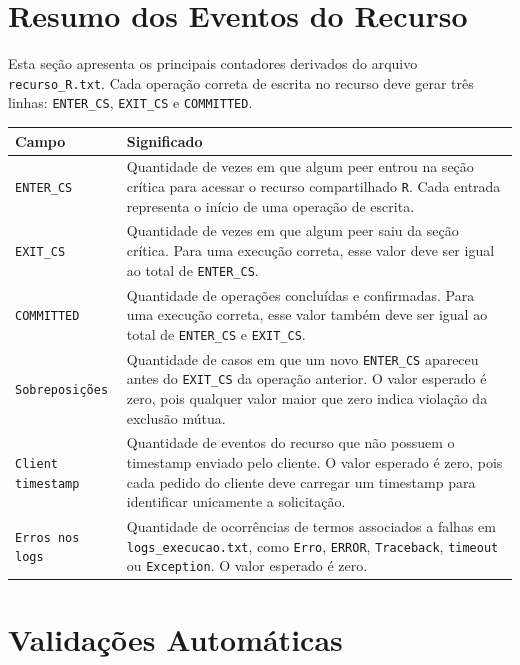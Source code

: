 \documentclass[12pt,a4paper]{article}
\begin{document}
\section{Resumo dos Eventos do Recurso}

Esta se\c{c}\~ao apresenta os principais contadores derivados do arquivo
\texttt{recurso\_R.txt}. Cada opera\c{c}\~ao correta de escrita no recurso deve gerar tr\^es
linhas: \texttt{ENTER\_CS}, \texttt{EXIT\_CS} e \texttt{COMMITTED}.

\begin{longtable}{>{\raggedright\arraybackslash}p{4cm} >{\raggedright\arraybackslash}p{10cm}}
\toprule
\textbf{Campo} & \textbf{Significado} \\
\midrule
\texttt{ENTER\_CS} &
Quantidade de vezes em que algum peer entrou na se\c{c}\~ao cr\'itica para acessar o recurso
compartilhado \texttt{R}. Cada entrada representa o in\'icio de uma opera\c{c}\~ao de escrita. \\
\texttt{EXIT\_CS} &
Quantidade de vezes em que algum peer saiu da se\c{c}\~ao cr\'itica. Para uma execu\c{c}\~ao
correta, esse valor deve ser igual ao total de \texttt{ENTER\_CS}. \\
\texttt{COMMITTED} &
Quantidade de opera\c{c}\~oes conclu\'idas e confirmadas. Para uma execu\c{c}\~ao correta,
esse valor tamb\'em deve ser igual ao total de \texttt{ENTER\_CS} e \texttt{EXIT\_CS}. \\
\texttt{Sobreposi\c{c}\~oes} &
Quantidade de casos em que um novo \texttt{ENTER\_CS} apareceu antes do \texttt{EXIT\_CS}
da opera\c{c}\~ao anterior. O valor esperado \'e zero, pois qualquer valor maior que zero
indica viola\c{c}\~ao da exclus\~ao m\'utua. \\
\texttt{Client timestamp} &
Quantidade de eventos do recurso que n\~ao possuem o timestamp enviado pelo cliente. O valor
esperado \'e zero, pois cada pedido do cliente deve carregar um timestamp para identificar
unicamente a solicita\c{c}\~ao. \\
\texttt{Erros nos logs} &
Quantidade de ocorr\^encias de termos associados a falhas em \texttt{logs\_execucao.txt},
como \texttt{Erro}, \texttt{ERROR}, \texttt{Traceback}, \texttt{timeout} ou
\texttt{Exception}. O valor esperado \'e zero. \\
\bottomrule
\end{longtable}

\section{Valida\c{c}\~oes Autom\'aticas}
\end{document}
